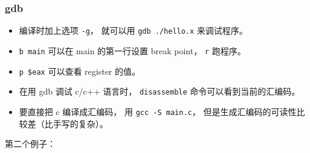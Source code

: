 \subsubsection{gdb}
\begin{itemize}
\item 编译时加上选项 \verb|-g|， 就可以用 \verb|gdb ./hello.x| 来调试程序。
\item \verb|b main| 可以在 main 的第一行设置 break point， \verb|r| 跑程序。
\item \verb|p $eax| 可以查看 register 的值。
\item 在用 gdb 调试 c/c++ 语言时， \verb|disassemble| 命令可以看到当前的汇编码。
\item 要直接把 c 编译成汇编码， 用 \verb|gcc -S main.c|， 但是生成汇编码的可读性比较差（比手写的复杂）。
\end{itemize}


第二个例子：

